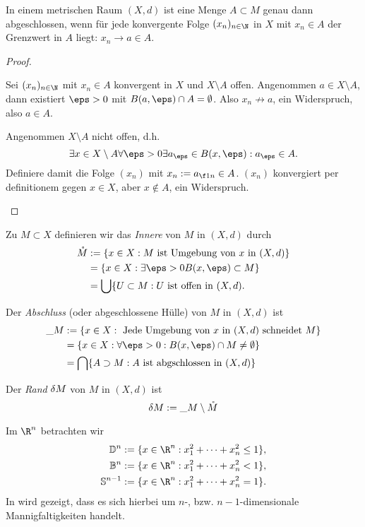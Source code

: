 \begin{prop}
	In einem metrischen Raum $(X,d)$ ist eine Menge $A \subset M$ genau dann abgeschlossen,
	wenn für jede konvergente Folge $(x_n)_{n\in\N}$ in $X$ mit $x_n \in A$ der Grenzwert in $A$ liegt: $x_n \to a \in A$.
	\begin{proof}
		\begin{segnb}[„$\implies$“]
			Sei $(x_n)_{n\in\N}$ mit $x_n \in A$ konvergent in $X$ und $X \setminus A$ offen.
			Angenommen $a \in X \setminus A$, dann existiert $\eps > 0$ mit $B(a,\eps) \cap A = \emptyset$.
			Also $x_n \not\to a$, ein Widerspruch, also $a \in A$.
		\end{segnb}
		\begin{segnb}[„$\impliedby$“]
			Angenommen $X \setminus A$ nicht offen, d.h.
			\[
				\exists x \in X \setminus A \forall \eps > 0 \exists a_\eps \in B(x,\eps) : a_\eps \in A.
			\]
			Definiere damit die Folge $(x_n)$ mit $x_n := a_{\f 1n} \in A$.
			$(x_n)$ konvergiert per definitionem gegen $x \in X$, aber $x \not\in A$, ein Widerspruch.
		\end{segnb}
	\end{proof}
\end{prop}

\begin{df}
	Zu $M \subset X$ definieren wir das \emph{Innere} von $M$ in $(X,d)$ durch
	\begin{align*}
		\mathring M &:= \{ x \in X : M \text{ ist Umgebung von $x$ in $(X,d)$} \} \\
		&= \{ x \in X : \exists \eps > 0 B(x,\eps) \subset M \} \\
		&= \bigcup \{ U \subset M : U \text{ ist offen in $(X,d)$}.
	\end{align*}

	Der \emph{Abschluss} (oder abgeschlossene Hülle) von $M$ in $(X,d)$ ist
	\begin{align*}
		\_{M} &:= \{ x \in X : \text{ Jede Umgebung von $x$ in $(X,d)$ schneidet $M$} \} \\
		&= \{ x \in X : \forall \eps > 0 : B(x,\eps) \cap M \neq \emptyset \} \\
		&= \bigcap \{ A \supset M : \text{$A$ ist abgschlossen in $(X,d)$} \}
	\end{align*}

	Der \emph{Rand} $\delta M$ von $M$ in $(X,d)$ ist
	\[
		\delta M := \_{M} \setminus \mathring M
	\]
\end{df}

\begin{ex}
	Im $\R^n$ betrachten wir
	\begin{align*}
		\D^n := \{ x \in \R^n : x_1^2 + \dotsb + x_n^2 \le 1 \}, \\
		\B^n := \{ x \in \R^n : x_1^2 + \dotsb + x_n^2 < 1 \}, \\
		\S^{n-1} := \{ x \in \R^n : x_1^2 + \dotsb + x_n^2 = 1 \}.
	\end{align*}
	In  wird gezeigt, dass es sich hierbei um $n$-, bzw. $n-1$-dimensionale Mannigfaltigkeiten handelt.
\end{ex}

